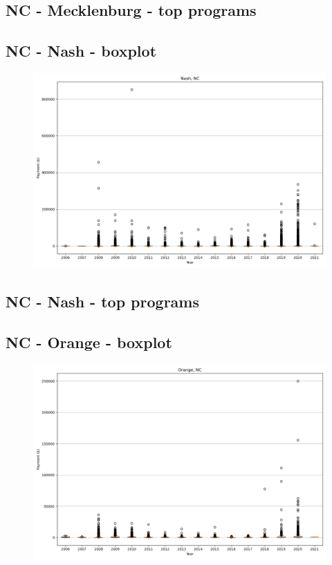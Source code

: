 \subsection*{NC - Mecklenburg - top programs}

\newpage
\subsection*{NC - Nash - boxplot}
\begin{figure}[h]
\centering
\includegraphics[width=7in]{../output/boxplots/counties/Nash-NC_boxplot.png}
\end{figure}


\subsection*{NC - Nash - top programs}

\newpage
\subsection*{NC - Orange - boxplot}
\begin{figure}[h]
\centering
\includegraphics[width=7in]{../output/boxplots/counties/Orange-NC_boxplot.png}
\end{figure}


